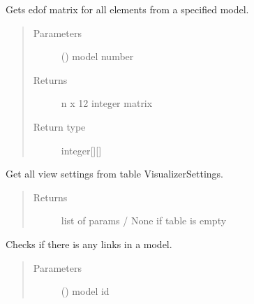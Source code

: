 \documentclass[letterpaper,10pt,english]{sphinxmanual}
\begin{document}
\begin{fulllineitems}

\begin{fulllineitems}
\label{\detokenize{api:beamon.database.database.Database.get_static_edof}}
Gets edof matrix for all elements from a specified model.
\begin{quote}\begin{description}
\item[{Parameters}] \leavevmode
{} () \textendash{} model number

\item[{Returns}] \leavevmode
n x 12 integer matrix

\item[{Return type}] \leavevmode
integer{[}{]}{[}{]}

\end{description}\end{quote}

\end{fulllineitems}


\begin{fulllineitems}
\label{\detokenize{api:beamon.database.database.Database.get_view_settings}}
Get all view settings from table VisualizerSettings.
\begin{quote}\begin{description}
\item[{Returns}] \leavevmode
list of params / None if table is empty

\end{description}\end{quote}

\end{fulllineitems}


\begin{fulllineitems}
\label{\detokenize{api:beamon.database.database.Database.has_links}}
Checks if there is any links in a model.
\begin{quote}\begin{description}
\item[{Parameters}] \leavevmode
{} () \textendash{} model id


\end{description}
\end{quote}
\end{fulllineitems}
\end{fulllineitems}
\end{document}
